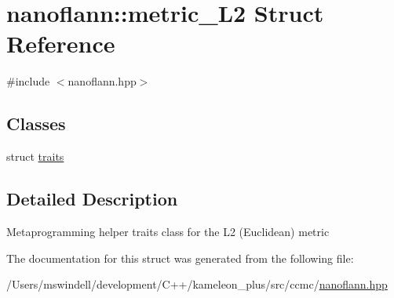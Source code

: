 \hypertarget{structnanoflann_1_1metric___l2}{\section{nanoflann\-:\-:metric\-\_\-\-L2 Struct Reference}
\label{structnanoflann_1_1metric___l2}
}


{\ttfamily \#include $<$nanoflann.\-hpp$>$}

\subsection*{Classes}
\begin{DoxyCompactItemize}
\item 
struct \hyperlink{structnanoflann_1_1metric___l2_1_1traits}{traits}
\end{DoxyCompactItemize}


\subsection{Detailed Description}
Metaprogramming helper traits class for the L2 (Euclidean) metric 

The documentation for this struct was generated from the following file\-:\begin{DoxyCompactItemize}
\item 
/\-Users/mswindell/development/\-C++/kameleon\-\_\-plus/src/ccmc/\hyperlink{nanoflann_8hpp}{nanoflann.\-hpp}\end{DoxyCompactItemize}
